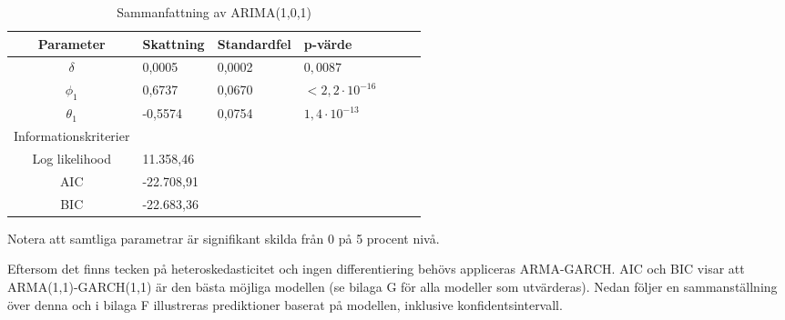 \documentclass[11pt]{article}
\numberwithin{equation}{section}
\numberwithin{table}{section}
\numberwithin{figure}{section}
\begin{document}
\begin{table}[H]
\caption{Sammanfattning av ARIMA(1,0,1)}
\begin{tabularx}{\textwidth}{c *{6}{Y}}
\toprule

Parameter  & Skattning & Standardfel & p-värde \\
\hline

$\delta$        & 0,0005  & 0,0002  & $0,0087$   \\
$\phi_1$        & 0,6737  & 0,0670  & $<2,2\cdot10^{-16}$   \\

$\theta_1$      & -0,5574 & 0,0754  &  $1,4\cdot10^{-13}$   \\
\midrule

Informationskriterier  & &  &  \\
\hline

Log likelihood        & 11.358,46 \\
AIC                   & -22.708,91 \\

BIC                   & -22.683,36 \\
\bottomrule
\end{tabularx}
\footnotesize{Notera att samtliga parametrar är signifikant skilda från 0 på 5 procent nivå.}
\end{table}

Eftersom det finns tecken på heteroskedasticitet och ingen differentiering behövs appliceras ARMA-GARCH. AIC och BIC visar att ARMA(1,1)-GARCH(1,1) är den bästa möjliga modellen (se bilaga G för alla modeller som utvärderas). Nedan följer en sammanställning över denna och i bilaga F illustreras prediktioner baserat på modellen, inklusive konfidentsintervall.
\end{document}
